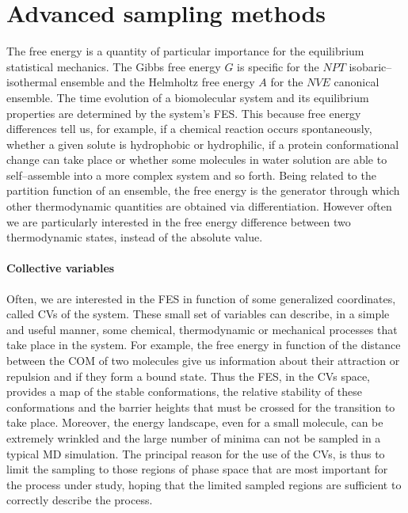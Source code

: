 \section{Advanced sampling methods}
The free energy is a quantity of particular importance for the equilibrium statistical mechanics. The 
Gibbs free energy $G$ is specific for the $NPT$ isobaric--isothermal ensemble and the Helmholtz free energy $A$ 
for the $NVE$ canonical ensemble. The time evolution of a biomolecular system and its equilibrium properties are 
determined by the system's \ac{FES}. This because free energy differences tell us, for example, if a chemical 
reaction occurs spontaneously, whether a given solute is hydrophobic or hydrophilic, if a protein conformational 
change can take place or whether some molecules in water solution are able to self--assemble into a more complex 
system and so forth. Being related to the partition function of an ensemble, the free energy is the generator 
through which other thermodynamic quantities are obtained via differentiation. However often we are particularly 
interested in the free energy difference between two thermodynamic states, instead of the absolute value. 

\paragraph{\textbf{Collective variables}} Often, we are interested in the \ac{FES} in function of some
generalized coordinates, called \acp{CV} of the system. These small set of variables can describe, in a simple
and useful manner, some chemical, thermodynamic or mechanical processes that take place in the system. For
example, the free energy in function of the distance between the \ac{COM} of two molecules give us information
about their attraction or repulsion and if they form a bound state. Thus the \ac{FES}, in the \acp{CV} space,
provides a map of the stable conformations, the relative stability of these conformations and the barrier heights
that must be crossed for the transition to take place. Moreover, the energy landscape, even for a small molecule,
can be extremely wrinkled and the large number of minima can not be sampled in a typical \ac{MD} simulation. The
principal reason for the use of the \acp{CV}, is thus to limit the sampling to those regions of phase space that
are most important for the process under study, hoping that the limited sampled regions are sufficient to
correctly describe the process.

